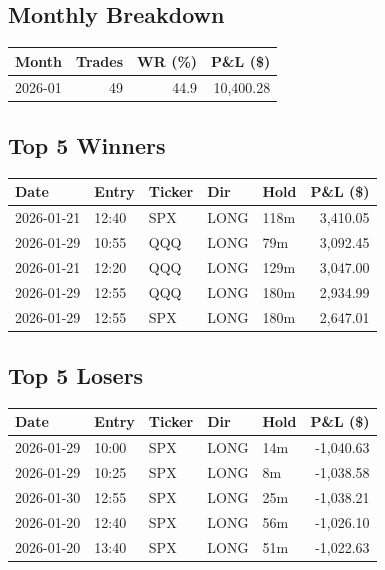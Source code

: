 \documentclass[11pt,a4paper,twoside]{article}
\begin{document}
\subsection{Monthly Breakdown}
\noindent\begin{center}
\begin{tabular}{>{\color{txtmain}}l rrr}
\toprule
\rowcolor{cardbg}
\textbf{Month} & \textbf{Trades} & \textbf{WR (\%)} & \textbf{P\&L (\$)} \\
\midrule
2026-01 & 49 & 44.9 & \textcolor{wingreen}{10,400.28} \\
\bottomrule
\end{tabular}
\end{center}
\subsection{Top 5 Winners}
\noindent\begin{center}
\begin{tabular}{>{\color{txtmain}}l llll r}
\toprule
\rowcolor{cardbg}
\textbf{Date} & \textbf{Entry} & \textbf{Ticker} & \textbf{Dir} & \textbf{Hold} & \textbf{P\&L (\$)} \\
\midrule
2026-01-21 & 12:40 & SPX & LONG & 118m & \textcolor{wingreen}{3,410.05} \\
2026-01-29 & 10:55 & QQQ & LONG & 79m & \textcolor{wingreen}{3,092.45} \\
2026-01-21 & 12:20 & QQQ & LONG & 129m & \textcolor{wingreen}{3,047.00} \\
2026-01-29 & 12:55 & QQQ & LONG & 180m & \textcolor{wingreen}{2,934.99} \\
2026-01-29 & 12:55 & SPX & LONG & 180m & \textcolor{wingreen}{2,647.01} \\
\bottomrule
\end{tabular}
\end{center}
\subsection{Top 5 Losers}
\noindent\begin{center}
\begin{tabular}{>{\color{txtmain}}l llll r}
\toprule
\rowcolor{cardbg}
\textbf{Date} & \textbf{Entry} & \textbf{Ticker} & \textbf{Dir} & \textbf{Hold} & \textbf{P\&L (\$)} \\
\midrule
2026-01-29 & 10:00 & SPX & LONG & 14m & \textcolor{lossred}{-1,040.63} \\
2026-01-29 & 10:25 & SPX & LONG & 8m & \textcolor{lossred}{-1,038.58} \\
2026-01-30 & 12:55 & SPX & LONG & 25m & \textcolor{lossred}{-1,038.21} \\
2026-01-20 & 12:40 & SPX & LONG & 56m & \textcolor{lossred}{-1,026.10} \\
2026-01-20 & 13:40 & SPX & LONG & 51m & \textcolor{lossred}{-1,022.63} \\
\bottomrule
\end{tabular}
\end{center}
\clearpage
\end{document}
